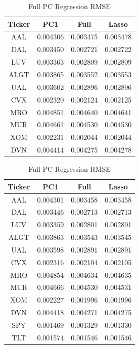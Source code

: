 \documentclass{article}
\begin{document}
\begin{table}[!htb]
    \begin{minipage}{.5\linewidth}
      \caption{Airline and Oil PC Regression RMSE}
      \centering
      \begin{tabular}{ c|c|c|c }
        \textbf{Ticker} & \textbf{PC1} & \textbf{Full} & \textbf{Lasso} \\
        \hline
        AAL	& 0.004306	& 0.003475	& 0.003478\\
        DAL	& 0.003450	& 0.002721	& 0.002722\\
        LUV	& 0.003363	& 0.002809	& 0.002809\\
        ALGT & 0.003865	& 0.003552	& 0.003553\\
        UAL	& 0.003602	& 0.002896	& 0.002896\\
        CVX	& 0.002320	& 0.002124	& 0.002125\\
        MRO	& 0.004851	& 0.004640	& 0.004641\\
        MUR	& 0.004661	& 0.004530	& 0.004530\\
        XOM	& 0.002231	& 0.002044	& 0.002044\\
        DVN	& 0.004414	& 0.004275	& 0.004278\\
        \end{tabular}
    \end{minipage}%
    \begin{minipage}{.5\linewidth}
      \centering
        \caption{Full PC Regression RMSE}
        \begin{tabular}{ c|c|c|c  }
            \textbf{Ticker} & \textbf{PC1} & \textbf{Full} & \textbf{Lasso} \\
            \hline
            AAL	& 0.004301	& 0.003458	& 0.003458\\
            DAL	& 0.003446	& 0.002713	& 0.002713\\
            LUV	& 0.003359	& 0.002801	& 0.002801\\
            ALGT & 0.003863	& 0.003543	& 0.003545\\
            UAL	& 0.003598	& 0.002891	& 0.002891\\
            CVX	& 0.002316	& 0.002104	& 0.002105\\
            MRO	& 0.004854	& 0.004634	& 0.004635\\
            MUR	& 0.004666	& 0.004530	& 0.004531\\
            XOM	& 0.002227	& 0.001996	& 0.001996\\
            DVN	& 0.004418	& 0.004271	& 0.004275\\
            SPY	& 0.001469	& 0.001329	& 0.001330\\
            TLT	& 0.001574	& 0.001546	& 0.001546\\
        \end{tabular}
    \end{minipage} 
\end{table}
\end{document}

